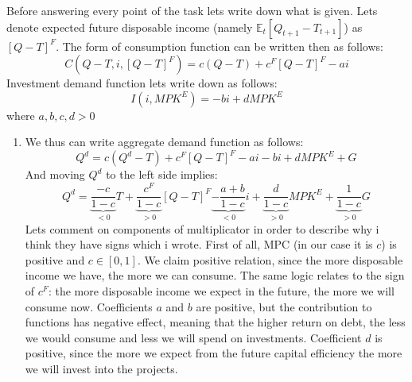 \documentclass[11pt, oneside]{article}
\newcommand{\E}{\mathbb{E}}
\begin{document}
Before answering every point of the task lets write down what is given. Lets denote expected future disposable income (namely $ \E_{t} [Q_{t+1} - T_{t+1}]$) as $ [Q-T]^{F} $. The form of consumption function can be written then as follows:
\[
C(Q-T, i,  [Q-T]^{F}) = c(Q-T) + c^{F}[Q-T]^{F} - ai
\]
Investment demand function lets write down as follows:
\[
I(i, MPK^{E}) = -bi + dMPK^{E}
\]
where $ a, b, c, d >0 $
\begin{enumerate}[(1)]
	\item We thus can write aggregate demand function as follows:
	\[
	Q^{d} = c(Q^{d}-T) + c^{F}[Q-T]^{F} - ai -bi + dMPK^{E} + G
	\]
	And moving $ Q^{d} $ to the left side implies:
	\[
	Q^{d} = \underbrace{\frac{-c}{1-c}}_{<0}T + \underbrace{\frac{c^{F}}{1-c}}_{>0}[Q-T]^{F} \underbrace{-\frac{a+b}{1-c}}_{<0}i +\underbrace{\frac{d}{1-c}}_{>0}MPK^{E} + \underbrace{\frac{1}{1-c}}_{>0}G
	\]
	Lets comment on components of multiplicator in order to describe why i think they have signs which i wrote. First of all, MPC (in our case it is $ c $) is positive and $ c\in [0, 1] $. We claim positive relation, since the more disposable income we have, the more we can consume. The same logic relates to the sign of $ c^{F} $: the more disposable income we expect in the future, the more we will consume now. Coefficients $ a $ and $ b $ are positive, but the contribution to functions has negative effect, meaning that the higher return on debt, the less we would consume and less we will spend on investments. Coefficient $ d $ is positive, since the more we expect from the future capital efficiency the more we will invest into the projects.
	

\end{enumerate}
\end{document}
